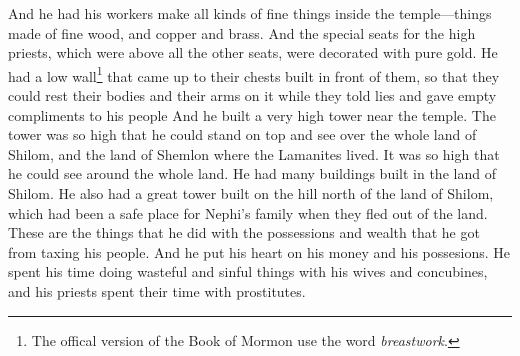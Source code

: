 And he had his workers make all kinds of fine things inside the temple---things made of fine wood, and copper and brass.
\bverse \iffalse And the seats which were set apart for the high priests, which were above all the other seats, he did ornament with pure gold; and he caused a breastwork to be built before them, that they might rest their bodies and their arms upon while they should speak lying and vain words to his people. \fi
And the special seats for the high priests, which were above all the other seats, were decorated with pure gold. He had a low wall\footnote{The offical version of the Book of Mormon use the word \textit{breastwork}.} that came up to their chests built in front of them, so that they could rest their bodies and their arms on it while they told lies and gave empty compliments to his people
\bverse \iffalse And it came to pass that he built a tower near the temple; yea, a very high tower, even so high that he could stand upon the top thereof and overlook the land of Shilom, and also the land of Shemlon, which was possessed by the Lamanites; and he could even look over all the land round about. \fi
And he built a very high tower near the temple. The tower was so high that he could stand on top and see over the whole land of Shilom, and the land of Shemlon where the Lamanites lived. It was so high that he could see around the whole land.
\bverse \iffalse And it came to pass that he caused many buildings to be built in the land Shilom; and he caused a great tower to be built on the hill north of the land Shilom, which had been a resort for the children of Nephi at the time they fled out of the land; and thus he did do with the riches which he obtained by the taxation of his people. \fi
He had many buildings built in the land of Shilom. He also had a great tower built on the hill north of the land of Shilom, which had been a safe place for Nephi's family when they fled out of the land. These are the things that he did with the possessions and wealth that he got from taxing his people.
\bverse \iffalse And it came to pass that he placed his heart upon his riches, and he spent his time in riotous living with his wives and his concubines; and so did also his priests spend their time with harlots. \fi
And he put his heart on his money and his possesions. He spent his time doing wasteful and sinful things with his wives and concubines, and his priests spent their time with prostitutes.
\bverse \iffalse And it came to pass that he planted vineyards round about in the land; and he built wine-presses, and made wine in abundance; and therefore he became a wine-bibber, and also his people. \fi
